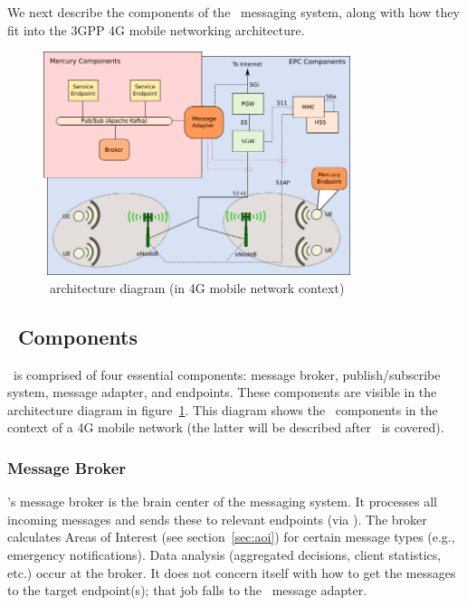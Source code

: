 We next describe the components of the \name~messaging system, along
with how they fit into the 3GPP 4G mobile networking architecture.

\begin{figure}[ht]
  \centering
  \includegraphics[width=0.8\textwidth]{figs/mercury-arch.png}
  \caption{\name~architecture diagram (in 4G mobile network context)}
  \label{fig:arch}
\end{figure}

\subsection{\name~Components}

\name~is comprised of four essential components: message broker,
publish/subscribe system, message adapter, and endpoints.  These
components are visible in the architecture diagram in
figure~\ref{fig:arch}. This diagram shows the \name~components
in the context of a 4G mobile network (the latter will be described
after \name~is covered).

\subsubsection{Message Broker}

\name's message broker is the brain center of the messaging
system. It processes all incoming messages and sends these to relevant
endpoints (via \pubsub). The broker calculates Areas of Interest (see
section~\ref{sec:aoi}) for certain message types (e.g., emergency
notifications).  Data analysis (aggregated decisions, client
statistics, etc.) occur at the broker. It does not concern itself with
how to get the messages to the target endpoint(s); that job falls to
the \name~message adapter.

